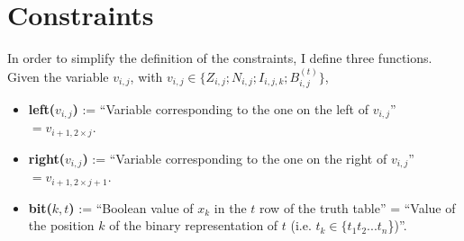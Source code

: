 \documentclass[letterpaper,10pt]{article}
\begin{document}
\section{Constraints}
In order to simplify the definition of the constraints, I define three functions. Given the variable $v_{i,j}$, with $v_{i,j} \in \{Z_{i,j}; N_{i,j}; I_{i,j,k}; B_{i,j}^{(t)}\}$,
\begin{itemize}
    \item \textbf{left($v_{i,j}$)} := ``Variable corresponding to the one on the left of $v_{i,j}$'' $ = v_{i+1,2\times j}$.
    \item \textbf{right($v_{i,j}$)} := ``Variable corresponding to the one on the right of $v_{i,j}$'' $ = v_{i+1,2\times j+1}$.
    \item \textbf{bit($k,t$)} := ``Boolean value of $x_k$ in the $t$ row of the truth table'' = ``Value of the position $k$ of the binary representation of $t$ (i.e. $t_k \in \{t_1 t_2 ... t_n$\})''.
\end{itemize}
\end{document}
